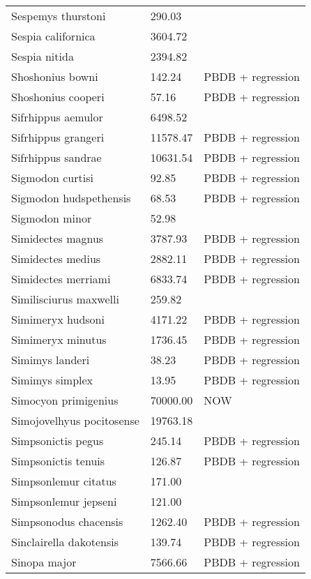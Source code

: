 \begin{center}
\begin{longtable}{p{} p{} p{} }
  Sespemys thurstoni & 290.03 & \cite{Tomiya2013} \\ 
  Sespia californica & 3604.72 & \cite{Tomiya2013} \\ 
  Sespia nitida & 2394.82 & \cite{VanValkenburgh2007a} \\ 
  Shoshonius bowni & 142.24 & PBDB + regression \\ 
  Shoshonius cooperi & 57.16 & PBDB + regression \\ 
  Sifrhippus aemulor & 6498.52 & \cite{Osborn1933} \\ 
  Sifrhippus grangeri & 11578.47 & PBDB + regression \\ 
  Sifrhippus sandrae & 10631.54 & PBDB + regression \\ 
  Sigmodon curtisi & 92.85 & PBDB + regression \\ 
  Sigmodon hudspethensis & 68.53 & PBDB + regression \\ 
  Sigmodon minor & 52.98 & \cite{Tomiya2013} \\ 
  Simidectes magnus & 3787.93 & PBDB + regression \\ 
  Simidectes medius & 2882.11 & PBDB + regression \\ 
  Simidectes merriami & 6833.74 & PBDB + regression \\ 
  Similisciurus maxwelli & 259.82 & \cite{Tomiya2013} \\ 
  Simimeryx hudsoni & 4171.22 & PBDB + regression \\ 
  Simimeryx minutus & 1736.45 & PBDB + regression \\ 
  Simimys landeri & 38.23 & PBDB + regression \\ 
  Simimys simplex & 13.95 & PBDB + regression \\ 
  Simocyon primigenius & 70000.00 & NOW \\ 
  Simojovelhyus pocitosense & 19763.18 & \cite{Wang1999} \\ 
  Simpsonictis pegus & 245.14 & PBDB + regression \\ 
  Simpsonictis tenuis & 126.87 & PBDB + regression \\ 
  Simpsonlemur citatus & 171.00 & \cite{Soligo2006} \\ 
  Simpsonlemur jepseni & 121.00 & \cite{Soligo2006} \\ 
  Simpsonodus chacensis & 1262.40 & PBDB + regression \\ 
  Sinclairella dakotensis & 139.74 & PBDB + regression \\ 
  Sinopa major & 7566.66 & PBDB + regression \\ 

\end{longtable}
\end{center}
